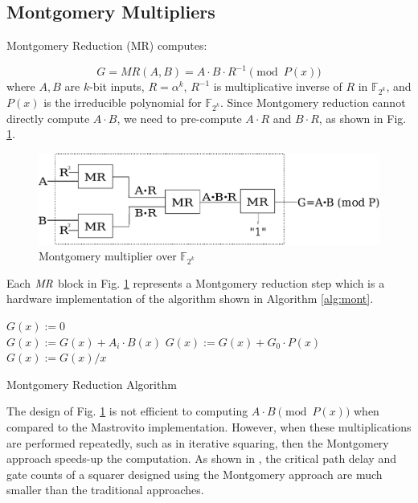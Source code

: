 \subsection{Montgomery Multipliers}
Montgomery Reduction (MR) computes: 

\begin{equation}
G=MR(A,B)=A\cdot B \cdot R^{-1} \pmod {P(x)}
\end{equation}
where $A,B$ are $k$-bit inputs, $R={\alpha}^k$, $R^{-1}$ is multiplicative
inverse of $R$ in $\mathbb{F}_{2^k}$, and $P(x)$ is the irreducible polynomial for
$\mathbb{F}_{2^k}$. Since Montgomery reduction cannot directly compute $A\cdot B$, 
we need to pre-compute $A\cdot R$ and $B\cdot R$,
as shown in Fig. \ref{fig:mm4}.  

\begin{figure}[h]
	\begin{center}
	\includegraphics[scale=0.50]{figures/mmcircuit}
	\end{center}
	\caption{Montgomery multiplier over $\mathbb{F}_{2^k}$}
	\label{fig:mm4}
\end{figure}

Each $\it MR$ block in Fig. \ref{fig:mm4} represents a Montgomery reduction step 
which is a hardware implementation of the algorithm shown in 
Algorithm \ref{alg:mont}. 

\begin{algorithm}
\SetAlgoNoLine

  $G(x):=$0 \\
  {
	$G(x):=G(x)+A_i\cdot B(x)$ 
	$G(x):=G(x)+G_0\cdot P(x)$ 
	$G(x):=G(x) / x$ 
  }
\caption{Montgomery Reduction Algorithm \cite{acar:1998}}\label{alg:mont}
\end{algorithm}

The design of Fig. \ref{fig:mm4} is not efficient to computing
$A\cdot B \pmod{ P(x)}$ when compared to the Mastrovito implementation.
However, when these multiplications are
performed repeatedly, such as in iterative squaring, then the
Montgomery approach speeds-up the computation. 
As shown in \cite{wu:2002}, the critical path delay and gate counts of a squarer 
designed using the Montgomery approach are much smaller than the traditional 
approaches.

